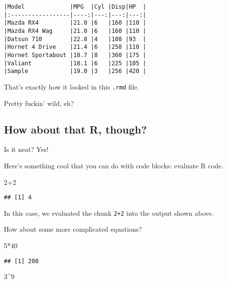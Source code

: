 \documentclass[
]{article}
\newenvironment{Shaded}{\begin{snugshade}}{\end{snugshade}}
\newcommand{\DecValTok}[1]{\textcolor[rgb]{0.00,0.00,0.81}{#1}}
\newcommand{\SpecialCharTok}[1]{\textcolor[rgb]{0.00,0.00,0.00}{#1}}
\begin{document}
\begin{verbatim}
|Model             |MPG  |Cyl |Disp|HP  |
|:-----------------|----:|---:|---:|---:|
|Mazda RX4         |21.0 |6   |160 |110 |
|Mazda RX4 Wag     |21.0 |6   |160 |110 |
|Datsun 710        |22.8 |4   |108 |93  |
|Hornet 4 Drive    |21.4 |6   |258 |110 |
|Hornet Sportabout |18.7 |8   |360 |175 |
|Valiant           |18.1 |6   |225 |105 |
|Sample            |19.0 |3   |256 |420 |
\end{verbatim}

That's exactly how it looked in this \texttt{.rmd} file.

Pretty fuckin' wild, eh?

\hypertarget{how-about-that-r-though}{%
\subsection{\texorpdfstring{How about that \textbf{R},
though?}{How about that R, though?}}\label{how-about-that-r-though}}

Is it neat? Yes!

Here's something cool that you can do with code blocks: evaluate R code.

\begin{Shaded}
\begin{Highlighting}[]
\DecValTok{2}\SpecialCharTok{+}\DecValTok{2}
\end{Highlighting}
\end{Shaded}

\begin{verbatim}
## [1] 4
\end{verbatim}

In this case, we evaluated the chunk \texttt{2+2} into the output shown
above.

How about some more complicated equations?

\begin{Shaded}
\begin{Highlighting}[]
\DecValTok{5}\SpecialCharTok{*}\DecValTok{40}
\end{Highlighting}
\end{Shaded}

\begin{verbatim}
## [1] 200
\end{verbatim}

\begin{Shaded}
\begin{Highlighting}[]
\DecValTok{3}\SpecialCharTok{\^{}}\DecValTok{9}
\end{Highlighting}
\end{Shaded}
\end{document}
